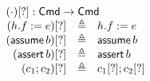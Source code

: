 \documentclass{article}
\newcommand{\Cmd}{\mathsf{Cmd}}
\newcommand{\matches}{\mathsf{matches}}
\newcommand{\action}{\mathsf{action}}
\newcommand{\keys}{\mathsf{keys}}
\newcommand{\data}{\mathsf{data}}
\newcommand{\assert}{\mathop{\mathsf{assert}}}
\newcommand{\assume}{\mathop{\mathsf{assume}}}
\newcommand{\apply}{\mathsf{apply}}
\newcommand{\choiceop}{\rotatebox[origin=c]{90}{$\sqsubset\!\!\!\sqsupset$}}
\newcommand{\choice}{\mathbin{\choiceop}}
\DeclareMathOperator*{\bigchoice}{\scalerel*{\choiceop}{\sum}}
\newcommand{\havoc}[1]{\mathop{\textsf{havoc}}#1}
\newcommand{\SKIP}{\mathsf{skip}}
\newcommand{\instr}{[?]}
\begin{document}
\begin{figure}[htp]
\[\begin{array}{r >{\triangleq}cl}
  \multicolumn{3}{l}{(\cdot)\instr : \Cmd \to \Cmd} \\
  (h.f := e)\instr && h.f := e \\
  (\assume b)\instr && \assume b \\
  (\assert b)\instr && \assert b\\
  (c_1;c_2)\instr && c_1\instr;c_2\instr\\

\end{array}\]
\end{figure}
\end{document}
